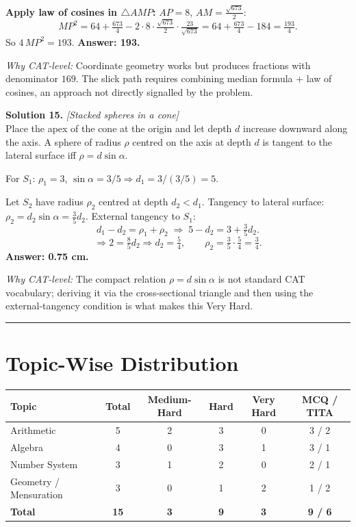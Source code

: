 \documentclass[11pt,a4paper]{article}
\begin{document}
\textbf{Apply law of cosines in $\triangle AMP$:} $AP = 8$, $AM = \tfrac{\sqrt{673}}{2}$:
\[
MP^{2} = 64 + \tfrac{673}{4} - 2 \cdot 8 \cdot \tfrac{\sqrt{673}}{2} \cdot \tfrac{23}{\sqrt{673}}
       = 64 + \tfrac{673}{4} - 184 = \tfrac{193}{4}.
\]
So $4\,MP^{2} = 193$.
\textbf{Answer: 193.}

\textit{Why CAT-level:} Coordinate geometry works but produces fractions with denominator $169$. The slick path requires combining median formula + law of cosines, an approach not directly signalled by the problem.

\vspace{4pt}
\textbf{Solution 15.} \textit{[Stacked spheres in a cone]}\\
Place the apex of the cone at the origin and let depth $d$ increase downward along the axis. A sphere of radius $\rho$ centred on the axis at depth $d$ is tangent to the lateral surface iff $\rho = d \sin\alpha$.

For $S_{1}$: $\rho_{1} = 3$, $\sin\alpha = 3/5 \Rightarrow d_{1} = 3 / (3/5) = 5$.

Let $S_{2}$ have radius $\rho_{2}$ centred at depth $d_{2} < d_{1}$. Tangency to lateral surface:
$\rho_{2} = d_{2} \sin\alpha = \tfrac{3}{5}d_{2}$. External tangency to $S_{1}$:
\[
d_{1} - d_{2} = \rho_{1} + \rho_{2} \;\Longrightarrow\; 5 - d_{2} = 3 + \tfrac{3}{5}d_{2}.
\]
\[
\Rightarrow 2 = \tfrac{8}{5}d_{2} \Rightarrow d_{2} = \tfrac{5}{4},\qquad \rho_{2} = \tfrac{3}{5}\cdot\tfrac{5}{4} = \tfrac{3}{4}.
\]
\textbf{Answer: 0.75 cm.}

\textit{Why CAT-level:} The compact relation $\rho = d \sin\alpha$ is not standard CAT vocabulary; deriving it via the cross-sectional triangle and then using the external-tangency condition is what makes this Very Hard.

\hrule

\section*{Topic-Wise Distribution}

\begin{center}
\begin{tabular}{|l|c|c|c|c|c|}
\hline
\textbf{Topic} & \textbf{Total} & \textbf{Medium-Hard} & \textbf{Hard} & \textbf{Very Hard} & \textbf{MCQ / TITA} \\
\hline
Arithmetic         & 5 & 2 & 3 & 0 & 3 / 2 \\
Algebra            & 4 & 0 & 3 & 1 & 3 / 1 \\
Number System      & 3 & 1 & 2 & 0 & 2 / 1 \\
Geometry / Mensuration & 3 & 0 & 1 & 2 & 1 / 2 \\
\hline
\textbf{Total}     & \textbf{15} & \textbf{3} & \textbf{9} & \textbf{3} & \textbf{9 / 6} \\
\hline
\end{tabular}
\end{center}
\end{document}
